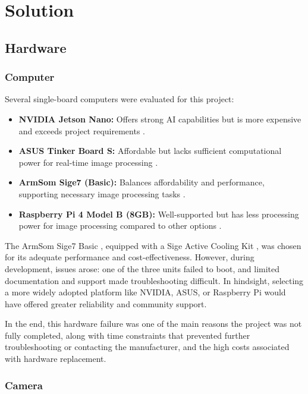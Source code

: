 \chapter{Solution}

\section{Hardware}

\subsection{Computer}

Several single-board computers were evaluated for this project:

\begin{itemize}
	\item \textbf{NVIDIA Jetson Nano:} Offers strong AI capabilities but is more expensive and exceeds project requirements \cite{nvidia_jetson_nano}.
	\item \textbf{ASUS Tinker Board S:} Affordable but lacks sufficient computational power for real-time image processing \cite{asus_tinkerboard_s}.
	\item \textbf{ArmSom Sige7 (Basic):} Balances affordability and performance, supporting necessary image processing tasks \cite{armsom_sige7}.
	\item \textbf{Raspberry Pi 4 Model B (8GB):} Well-supported but has less processing power for image processing compared to other options \cite{raspberry_pi_4b}.
\end{itemize}

The ArmSom Sige7 Basic \cite{armsom_sige7}, equipped with a Sige Active Cooling Kit \cite{armsom_sige_cooling_kit}, was chosen for its adequate performance and cost-effectiveness. However, during development, issues arose: one of the three units failed to boot, and limited documentation and support made troubleshooting difficult. In hindsight, selecting a more widely adopted platform like NVIDIA, ASUS, or Raspberry Pi would have offered greater reliability and community support.

In the end, this hardware failure was one of the main reasons the project was not fully completed, along with time constraints that prevented further troubleshooting or contacting the manufacturer, and the high costs associated with hardware replacement.

\subsection{Camera}

